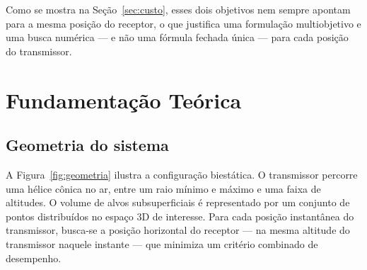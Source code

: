 \documentclass[11pt,a4paper]{article}
\begin{document}
Como se mostra na Seção~\ref{sec:custo}, esses dois objetivos nem sempre apontam para a mesma
posição do receptor, o que justifica uma formulação multiobjetivo e uma busca numérica — e não uma
fórmula fechada única — para cada posição do transmissor.

\section{Fundamentação Teórica}

\subsection{Geometria do sistema}

A Figura~\ref{fig:geometria} ilustra a configuração biestática. O transmissor percorre uma hélice
cônica no ar, entre um raio mínimo e máximo e uma faixa de altitudes. O volume de alvos
subsuperficiais é representado por um conjunto de pontos distribuídos no espaço 3D de interesse.
Para cada posição instantânea do transmissor, busca-se a posição horizontal do receptor — na mesma
altitude do transmissor naquele instante — que minimiza um critério combinado de desempenho.
\end{document}
